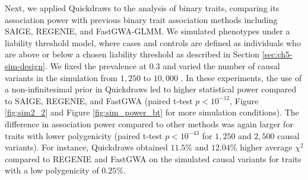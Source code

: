 %
Next, we applied Quickdraws to the analysis of binary traits, comparing its association power with previous binary trait association methods including SAIGE, REGENIE, and FastGWA-GLMM.
%
We simulated phenotypes under a liability threshold model, where cases and controls are defined as individuals who are above or below a chosen liability threshold as described in Section \ref{sec:ch5-sim-design}.
%
We fixed the prevalence at $0.3$ and varied the number of causal variants in the simulation from $1{,}250$ to $10{,}000$ \cite{stahl2012bayesian, zeng2018signatures, o2019extreme}.
%
In these experiments, the use of a non-infinitesimal prior in Quickdraws led to higher statistical power compared to SAIGE, REGENIE, and FastGWA (paired t-test $p < 10^{-12}$, Figure \ref{fig:sim2_2} and Figure \ref{fig:sim_power_bt} for more simulation conditions).
%
The difference in association power compared to other methods was again larger for traits with lower polygenicity (paired t-test $p < 10^{-43}$ for $1{,}250$ and $2{,}500$ causal variants).
%
For instance, Quickdraws obtained $11.5\%$ and $12.04\%$ higher average $\chi^2$ compared to REGENIE and FastGWA on the simulated causal variants for traits with a low polygenicity of $0.25\%$.

